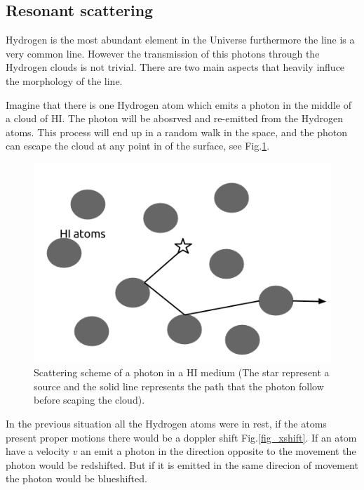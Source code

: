 \subsection{Resonant scattering}\label{sec:resonant}

Hydrogen is the most abundant element in the Universe furthermore
the \ly line is a very common line. However the transmission of this
\ly  photons through the Hydrogen clouds is not trivial. There 
are two main aspects that heavily influce the morphology of the line.

Imagine that there is one Hydrogen atom which emits 
a \ly photon in the middle of a cloud of HI. 
The \ly photon will be abosrved and re-emitted from 
the Hydrogen atoms. This process will end up in a random walk in the space,
and the photon can escape the cloud at any point in of the surface, see 
Fig.\ref{fig:rw}.\\

\begin{figure}[H]\label{fig:rw}
\begin{center}
\includegraphics[scale=0.4]{../Figures/randomwalk.png}
\end{center}\caption{Scattering scheme of a \ly photon in a HI medium
(The star represent a \ly source and the solid line represents the path that
the \ly photon follow before scaping the cloud).}
\end{figure}


In the previous situation all the Hydrogen atoms were in rest, if the atoms
present proper motions there would be a doppler shift Fig.\ref{fig_xshift}. 
If an atom have a velocity $v$ an emit a \ly photon in the direction 
opposite to the movement the \ly photon 
would be redshifted. But if it is emitted in the same direcion of movement the
\ly photon would be blueshifted.    

